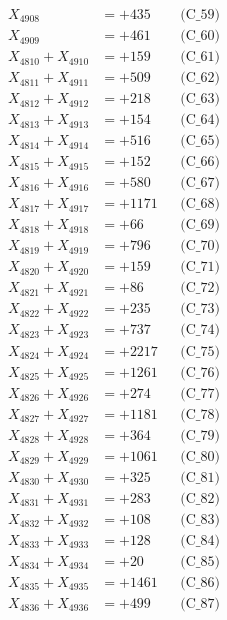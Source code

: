 \documentclass[a4paper,10pt]{article}
\begin{document}
{\begin{align}
X_{4908} &= +435 && \text{(C\_59)} \\
X_{4909} &= +461 && \text{(C\_60)} \\
\allowbreak
X_{4810} + X_{4910} &= +159 && \text{(C\_61)} \\
X_{4811} + X_{4911} &= +509 && \text{(C\_62)} \\
X_{4812} + X_{4912} &= +218 && \text{(C\_63)} \\
X_{4813} + X_{4913} &= +154 && \text{(C\_64)} \\
X_{4814} + X_{4914} &= +516 && \text{(C\_65)} \\
\allowbreak
X_{4815} + X_{4915} &= +152 && \text{(C\_66)} \\
X_{4816} + X_{4916} &= +580 && \text{(C\_67)} \\
X_{4817} + X_{4917} &= +1171 && \text{(C\_68)} \\
X_{4818} + X_{4918} &= +66 && \text{(C\_69)} \\
X_{4819} + X_{4919} &= +796 && \text{(C\_70)} \\
\allowbreak
X_{4820} + X_{4920} &= +159 && \text{(C\_71)} \\
X_{4821} + X_{4921} &= +86 && \text{(C\_72)} \\
X_{4822} + X_{4922} &= +235 && \text{(C\_73)} \\
X_{4823} + X_{4923} &= +737 && \text{(C\_74)} \\
X_{4824} + X_{4924} &= +2217 && \text{(C\_75)} \\
\allowbreak
X_{4825} + X_{4925} &= +1261 && \text{(C\_76)} \\
X_{4826} + X_{4926} &= +274 && \text{(C\_77)} \\
X_{4827} + X_{4927} &= +1181 && \text{(C\_78)} \\
X_{4828} + X_{4928} &= +364 && \text{(C\_79)} \\
X_{4829} + X_{4929} &= +1061 && \text{(C\_80)} \\
\allowbreak
X_{4830} + X_{4930} &= +325 && \text{(C\_81)} \\
X_{4831} + X_{4931} &= +283 && \text{(C\_82)} \\
X_{4832} + X_{4932} &= +108 && \text{(C\_83)} \\
X_{4833} + X_{4933} &= +128 && \text{(C\_84)} \\
X_{4834} + X_{4934} &= +20 && \text{(C\_85)} \\
\allowbreak
X_{4835} + X_{4935} &= +1461 && \text{(C\_86)} \\
X_{4836} + X_{4936} &= +499 && \text{(C\_87)} \\

\end{align}}
\end{document}
